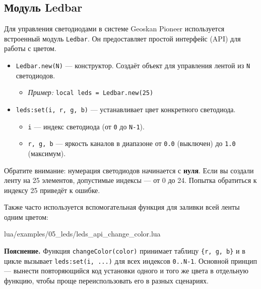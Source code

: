 \subsection{Модуль Ledbar}

Для управления светодиодами в системе Geoskan Pioneer используется встроенный модуль \texttt{Ledbar}. Он предоставляет простой интерфейс (API) для работы с цветом.

\begin{codebox}
\begin{itemize}
  \item \texttt{Ledbar.new(N)} — конструктор. Создаёт объект для управления лентой из \texttt{N} светодиодов.
  \begin{itemize}
      \item \textit{Пример:} \texttt{local leds = Ledbar.new(25)}
  \end{itemize}
  
  \item \texttt{leds:set(i, r, g, b)} — устанавливает цвет конкретного светодиода.
  \begin{itemize}
      \item \texttt{i} — индекс светодиода (от \texttt{0} до \texttt{N-1}).
      \item \texttt{r, g, b} — яркость каналов в диапазоне от \texttt{0.0} (выключен) до \texttt{1.0} (максимум).
  \end{itemize}
\end{itemize}
\end{codebox}

\begin{warnbox}[Индексация]
Обратите внимание: нумерация светодиодов начинается с \textbf{нуля}. Если вы создали ленту на 25 элементов, допустимые индексы — от 0 до 24. Попытка обратиться к индексу 25 приведёт к ошибке.
\end{warnbox}

Также часто используется вспомогательная функция для заливки всей ленты одним цветом:
\begin{codebox}
\begin{codefile}{lua/examples/05_leds/leds_api_change_color.lua}
\end{codefile}
\end{codebox}

\textbf{Пояснение.} Функция \verb|changeColor(color)| принимает таблицу \verb|{r, g, b}| и в цикле вызывает \verb|leds:set(i, ...)| для всех индексов \verb|0..N-1|. Основной принцип — вынести повторяющийся код установки одного и того же цвета в отдельную функцию, чтобы проще переиспользовать его в разных сценариях.

